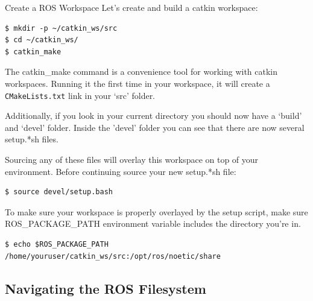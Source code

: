 \begin{frame}[fragile]{Create a ROS Workspace}
Let's create and build a catkin workspace: 

\begin{lstlisting}[language=shell]
$ mkdir -p ~/catkin_ws/src
$ cd ~/catkin_ws/
$ catkin_make
\end{lstlisting}

The catkin\_make command is a convenience tool for working with catkin workspaces. Running it the first time in your workspace, it will create a \texttt{CMakeLists.txt} link in your `src' folder. 

\vspace{.1cm}
Additionally, if you look in your current directory you should now have a `build' and `devel' folder. Inside the 'devel' folder you can see that there are now several setup.*sh files. 

\vspace{.1cm}
Sourcing any of these files will overlay this workspace on top of your environment. Before continuing source your new setup.*sh file: 

\begin{lstlisting}[language=shell]
$ source devel/setup.bash
\end{lstlisting}

To make sure your workspace is properly overlayed by the setup script, make sure ROS\_PACKAGE\_PATH environment variable includes the directory you're in. 

\begin{lstlisting}[language=shell]
$ echo $ROS_PACKAGE_PATH
/home/youruser/catkin_ws/src:/opt/ros/noetic/share
\end{lstlisting}
\end{frame}

\subsection{Navigating the ROS Filesystem}


